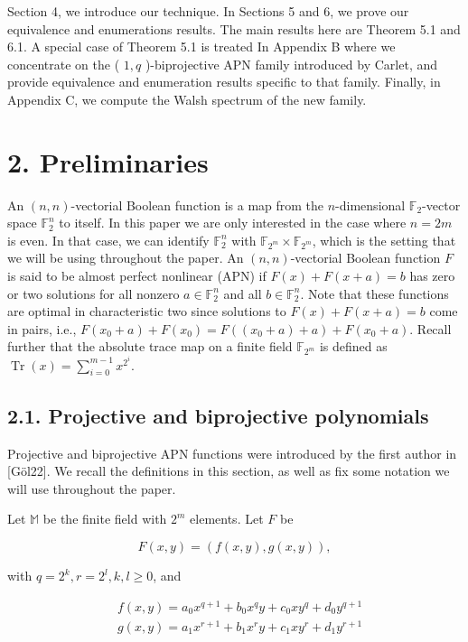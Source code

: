 \documentclass[10pt]{article}
\begin{document}
Section 4, we introduce our technique. In Sections 5 and 6, we prove our equivalence and enumerations results. The main results here are Theorem 5.1 and 6.1. A special case of Theorem 5.1 is treated In Appendix B where we concentrate on the ( $1, q$ )-biprojective APN family introduced by Carlet, and provide equivalence and enumeration results specific to that family. Finally, in Appendix C, we compute the Walsh spectrum of the new family.

\section*{2. Preliminaries}
An $(n, n)$-vectorial Boolean function is a map from the $n$-dimensional $\mathbb{F}_{2}$-vector space $\mathbb{F}_{2}^{n}$ to itself. In this paper we are only interested in the case where $n=2 m$ is even. In that case, we can identify $\mathbb{F}_{2}^{n}$ with $\mathbb{F}_{2^{m}} \times \mathbb{F}_{2^{m}}$, which is the setting that we will be using throughout the paper. An $(n, n)$-vectorial Boolean function $F$ is said to be almost perfect nonlinear (APN) if $F(x)+F(x+a)=b$ has zero or two solutions for all nonzero $a \in \mathbb{F}_{2}^{n}$ and all $b \in \mathbb{F}_{2}^{n}$. Note that these functions are optimal in characteristic two since solutions to $F(x)+F(x+a)=b$ come in pairs, i.e., $F\left(x_{0}+a\right)+F\left(x_{0}\right)=F\left(\left(x_{0}+a\right)+a\right)+F\left(x_{0}+a\right)$. Recall further that the absolute trace map on a finite field $\mathbb{F}_{2^{m}}$ is defined as $\operatorname{Tr}(x)=\sum_{i=0}^{m-1} x^{2^{i}}$.

\subsection*{2.1. Projective and biprojective polynomials}
Projective and biprojective APN functions were introduced by the first author in [Göl22]. We recall the definitions in this section, as well as fix some notation we will use throughout the paper.

Let $\mathbb{M}$ be the finite field with $2^{m}$ elements. Let $F$ be

$$
F(x, y)=(f(x, y), g(x, y)),
$$

with $q=2^{k}, r=2^{l}, k, l \geqslant 0$, and

$$
\begin{aligned}
& f(x, y)=a_{0} x^{q+1}+b_{0} x^{q} y+c_{0} x y^{q}+d_{0} y^{q+1} \\
& g(x, y)=a_{1} x^{r+1}+b_{1} x^{r} y+c_{1} x y^{r}+d_{1} y^{r+1}
\end{aligned}
$$
\end{document}
